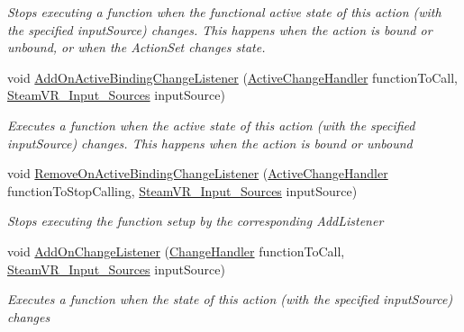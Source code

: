 \begin{DoxyCompactItemize}
\begin{DoxyCompactList}\small\item\em Stops executing a function when the {\itshape functional} active state of this action (with the specified input\+Source) changes. This happens when the action is bound or unbound, or when the Action\+Set changes state. \end{DoxyCompactList}\item 
void \mbox{\hyperlink{class_valve_1_1_v_r_1_1_steam_v_r___action___boolean_a0a88149176505a5fae559faf64494839}{Add\+On\+Active\+Binding\+Change\+Listener}} (\mbox{\hyperlink{class_valve_1_1_v_r_1_1_steam_v_r___action___boolean_af9f3044d5e4868485945b70d907c6bbb}{Active\+Change\+Handler}} function\+To\+Call, \mbox{\hyperlink{namespace_valve_1_1_v_r_a82e5bf501cc3aa155444ee3f0662853f}{Steam\+V\+R\+\_\+\+Input\+\_\+\+Sources}} input\+Source)
\begin{DoxyCompactList}\small\item\em Executes a function when the active state of this action (with the specified input\+Source) changes. This happens when the action is bound or unbound \end{DoxyCompactList}\item 
void \mbox{\hyperlink{class_valve_1_1_v_r_1_1_steam_v_r___action___boolean_ae2ada673d90157f6f51c401f22612860}{Remove\+On\+Active\+Binding\+Change\+Listener}} (\mbox{\hyperlink{class_valve_1_1_v_r_1_1_steam_v_r___action___boolean_af9f3044d5e4868485945b70d907c6bbb}{Active\+Change\+Handler}} function\+To\+Stop\+Calling, \mbox{\hyperlink{namespace_valve_1_1_v_r_a82e5bf501cc3aa155444ee3f0662853f}{Steam\+V\+R\+\_\+\+Input\+\_\+\+Sources}} input\+Source)
\begin{DoxyCompactList}\small\item\em Stops executing the function setup by the corresponding Add\+Listener \end{DoxyCompactList}\item 
void \mbox{\hyperlink{class_valve_1_1_v_r_1_1_steam_v_r___action___boolean_a4f96bf86478f1e5f91dec7c32a4a8616}{Add\+On\+Change\+Listener}} (\mbox{\hyperlink{class_valve_1_1_v_r_1_1_steam_v_r___action___boolean_a9dbdff089d05d822688005fa19fef120}{Change\+Handler}} function\+To\+Call, \mbox{\hyperlink{namespace_valve_1_1_v_r_a82e5bf501cc3aa155444ee3f0662853f}{Steam\+V\+R\+\_\+\+Input\+\_\+\+Sources}} input\+Source)
\begin{DoxyCompactList}\small\item\em Executes a function when the state of this action (with the specified input\+Source) changes \end{DoxyCompactList}\item 

\end{DoxyCompactItemize}
